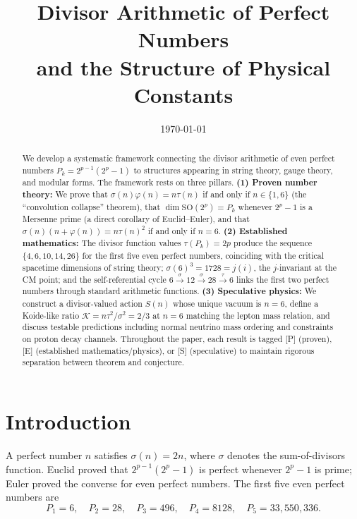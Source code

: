 \documentclass[11pt,letterpaper]{article}
\title{Divisor Arithmetic of Perfect Numbers\\
and the Structure of Physical Constants}
\author{}
\date{\today}
\theoremstyle{definition}
\theoremstyle{remark}
\newcommand{\proven}{\textsf{[P]}}
\newcommand{\established}{\textsf{[E]}}
\newcommand{\speculative}{\textsf{[S]}}
\begin{document}
\maketitle

\begin{abstract}
We develop a systematic framework connecting the divisor arithmetic 
of even perfect numbers $P_k = 2^{p-1}(2^p-1)$ to structures appearing in 
string theory, gauge theory, and modular forms.
The framework rests on three pillars.
\textbf{(1) Proven number theory:}
We prove that $\sigma(n)\varphi(n) = n\tau(n)$ if and only if $n \in \{1,6\}$ 
(the ``convolution collapse'' theorem), that 
$\dim\mathrm{SO}(2^p) = P_k$ whenever $2^p-1$ is a Mersenne prime 
(a direct corollary of Euclid--Euler),
and that $\sigma(n)(n+\varphi(n)) = n\tau(n)^2$ if and only if $n=6$.
\textbf{(2) Established mathematics:}
The divisor function values $\tau(P_k) = 2p$ produce the sequence 
$\{4,6,10,14,26\}$ for the first five even perfect numbers, coinciding with 
the critical spacetime dimensions of string theory;
$\sigma(6)^3 = 1728 = j(i)$, the $j$-invariant at the CM point; and 
the self-referential cycle $6 \xrightarrow{\sigma} 12 \xrightarrow{\sigma} 28 
\xrightarrow{\tau} 6$ links the first two perfect numbers through
standard arithmetic functions.
\textbf{(3) Speculative physics:}
We construct a divisor-valued action $S(n)$ whose unique vacuum is $n=6$, 
define a Koide-like ratio $\mathcal{K} = n\tau^2/\sigma^2 = 2/3$ at $n=6$ 
matching the lepton mass relation, and discuss testable predictions including 
normal neutrino mass ordering and constraints on proton decay channels.
Throughout the paper, each result is tagged \proven{} (proven), 
\established{} (established mathematics/physics), or \speculative{} (speculative) 
to maintain rigorous separation between theorem and conjecture.
\end{abstract}

\tableofcontents

\section{Introduction}
\label{sec:intro}

A perfect number $n$ satisfies $\sigma(n) = 2n$, where $\sigma$ denotes the 
sum-of-divisors function. Euclid proved that $2^{p-1}(2^p-1)$ is perfect 
whenever $2^p-1$ is prime; Euler proved the converse for even perfect numbers.
The first five even perfect numbers are
\begin{equation}\label{eq:perfects}
P_1 = 6, \quad P_2 = 28, \quad P_3 = 496, \quad P_4 = 8128, \quad P_5 = 33{,}550{,}336.
\end{equation}
\end{document}
